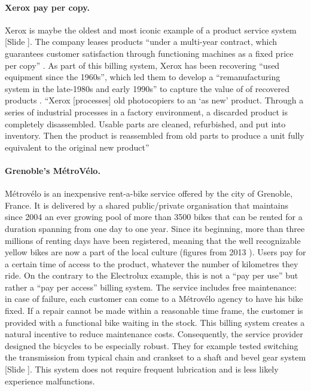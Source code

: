 \documentclass{article}
\newcounter{slide}
\begin{document}
\paragraph{Xerox pay per copy.}\label{Xerox}
Xerox is maybe the oldest and most iconic example of a product service system {\color{blue}[Slide ]}. The company leases products ``under a multi-year contract, which guarantees customer satisfaction through functioning machines as a fixed price per copy'' \cite{montProductserviceSystemsPanacea2004}. As part of this billing system, Xerox has been recovering ``used equipment since the 1960s'', which led them to develop a ``remanufacturing system in the late-1980s and early 1990s'' to capture the value of of recovered products \cite{kingPhotocopierRemanufacturingXerox2006}. ``Xerox [processes] old photocopiers to an `as new' product. Through a series of industrial processes in a factory environment, a discarded product is completely disassembled. Usable parts are cleaned, refurbished, and put into inventory. Then the product is reassembled from old parts to produce a unit fully equivalent to the original new product'' \cite{kingPhotocopierRemanufacturingXerox2006}

\paragraph{Grenoble's MétroVélo.}\label{MetroVelo} Métrovélo is an inexpensive rent-a-bike service offered by the city of Grenoble, France. It is delivered by a shared public/private organisation that maintains since 2004 an ever growing pool of more than 3500 bikes that can be rented for a duration spanning from one day to one year. Since its beginning, more than three millions of renting days have been registered, meaning that the well recognizable yellow bikes are now a part of the local culture (figures from 2013 \cite{bonvoisinOpennessSupportiveParadigm2013}). Users pay for a certain time of access to the product, whatever the number of kilometres they ride. On the contrary to the Electrolux example, this is not a ``pay per use'' but rather a ``pay per access'' billing system. The service includes free maintenance: in case of failure, each customer can come to a Métrovélo agency to have his bike fixed. If a repair cannot be made within a reasonable time frame, the customer is provided with a functional bike waiting in the stock. This billing system creates a natural incentive to reduce maintenance costs. Consequently,  the service provider designed the bicycles to be especially robust. They for example tested switching the transmission from typical chain and crankset to a shaft and bevel gear system {\color{blue}[Slide ]}. This system does not require frequent lubrication and is less likely experience malfunctions. 
\end{document}
